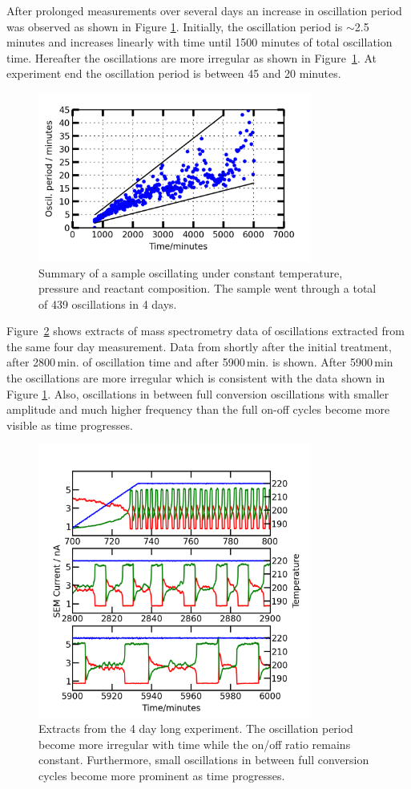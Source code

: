 \documentclass[8.5pt,twoside,twocolumn]{article}
\begin{document}
After prolonged measurements over several days an increase in oscillation period was observed as shown in Figure \ref{fgr:long_measurement}. Initially, the oscillation period is $\sim$2.5 minutes and increases linearly with time until 1500 minutes of total oscillation time. Hereafter the oscillations are more irregular as shown in Figure~\ref{fgr:long_measurement}. At experiment end the oscillation period is between 45 and 20 minutes.
\begin{figure}[h]
\centering
  \includegraphics[width=9cm]{summary_of_long_measurement.png}
  \caption{Summary of a sample oscillating under constant temperature, pressure and reactant composition. The sample went through a total of 439 oscillations in 4 days.}
  \label{fgr:long_measurement}
\end{figure}
  
Figure~\ref{fgr:extracts} shows extracts of mass spectrometry data of oscillations extracted from the same four day measurement. Data from shortly after the initial treatment, after 2800\,min. of oscillation time and after 5900\,min. is shown. After 5900\,min the oscillations are more irregular which is consistent with the data shown in Figure \ref{fgr:long_measurement}. Also, oscillations in between full conversion oscillations with smaller amplitude and much higher frequency than the full on-off cycles become more visible as time progresses.
\begin{figure}[h]
  \centering
  \includegraphics[width=9cm]{extracts_from_very_long_oscillation.png}
  \caption{Extracts from the 4 day long experiment. The oscillation period become more irregular with time while the on/off ratio remains constant. Furthermore, small oscillations in between full conversion cycles become more prominent as time progresses.}
  \label{fgr:extracts}
\end{figure}
\end{document}
